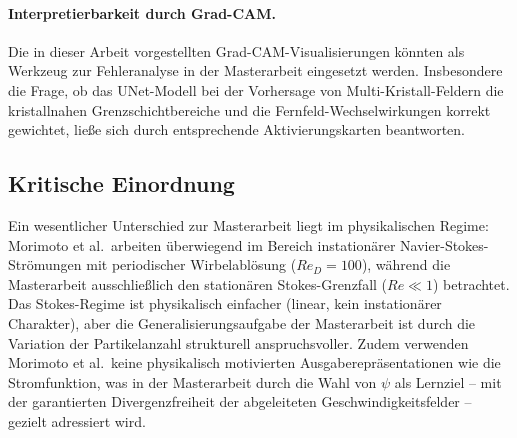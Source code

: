 \documentclass[a4paper,12pt]{article}
\begin{document}
\paragraph{Interpretierbarkeit durch Grad-CAM.}
Die in dieser Arbeit vorgestellten Grad-CAM-Visualisierungen könnten als Werkzeug zur Fehleranalyse in der Masterarbeit eingesetzt werden. Insbesondere die Frage, ob das UNet-Modell bei der Vorhersage von Multi-Kristall-Feldern die kristallnahen Grenzschichtbereiche und die Fernfeld-Wechselwirkungen korrekt gewichtet, ließe sich durch entsprechende Aktivierungskarten beantworten.

\subsection*{Kritische Einordnung}

Ein wesentlicher Unterschied zur Masterarbeit liegt im physikalischen Regime: Morimoto et al.\ arbeiten überwiegend im Bereich instationärer Navier-Stokes-Strömungen mit periodischer Wirbelablösung ($Re_D = 100$), während die Masterarbeit ausschließlich den stationären Stokes-Grenzfall ($Re \ll 1$) betrachtet. Das Stokes-Regime ist physikalisch einfacher (linear, kein instationärer Charakter), aber die Generalisierungsaufgabe der Masterarbeit ist durch die Variation der Partikelanzahl strukturell anspruchsvoller. Zudem verwenden Morimoto et al.\ keine physikalisch motivierten Ausgaberepräsentationen wie die Stromfunktion, was in der Masterarbeit durch die Wahl von $\psi$ als Lernziel -- mit der garantierten Divergenzfreiheit der abgeleiteten Geschwindigkeitsfelder -- gezielt adressiert wird.
\end{document}
